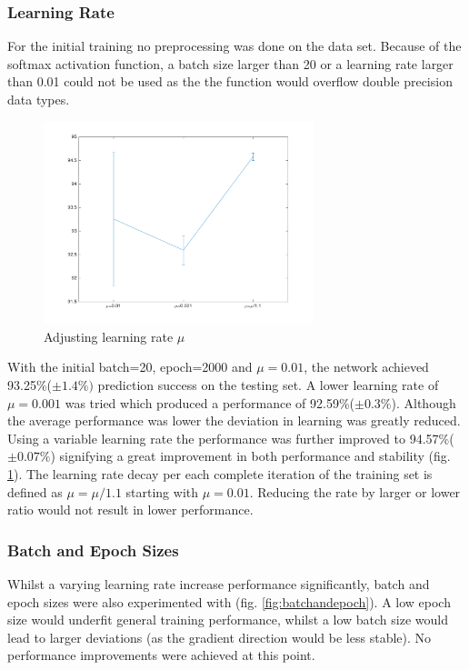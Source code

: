 \documentclass[11]{article}
\begin{document}
\subsubsection{Learning Rate}

For the initial training no preprocessing was done on the data set. Because of the softmax activation function, a batch size larger than 20 or a learning rate larger than 0.01 could not be used as the the function would overflow double precision data types.

\begin{figure}[h]
\centering
\includegraphics[width=0.7\textwidth]{learning_rate.png}
\caption{Adjusting learning rate $\mu$}
\label{fig:learningrate}
\end{figure}

With the initial batch=20, epoch=2000 and $\mu=0.01$, the network achieved 93.25\%($\pm 1.4\%)$ prediction success on the testing set.  A lower learning rate of $\mu=0.001$ was tried which produced a performance of 92.59\%($\pm 0.3\%$). Although the average performance was lower the deviation in learning was greatly reduced. Using a variable learning rate the performance was further improved to 94.57\%($\pm 0.07\%$) signifying a great improvement in both performance and stability (fig. \ref{fig:learningrate}). The learning rate decay per each complete iteration of the training set is defined as $\mu = \mu / 1.1$ starting with $\mu=0.01$. Reducing the rate by larger or lower ratio would not result in lower performance.


\subsubsection{Batch and Epoch Sizes}
Whilst a varying learning rate increase performance significantly, batch and epoch sizes were also experimented with (fig. \ref{fig:batchandepoch}). A low epoch size would underfit general training performance, whilst a low batch size would lead to larger deviations (as the gradient direction would be less stable). No performance improvements were achieved at this point. 
\end{document}
